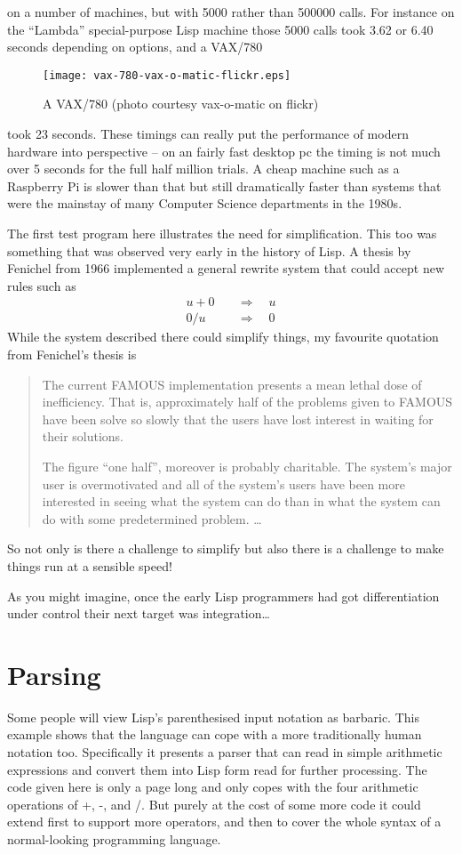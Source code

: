 on a number of machines, but with 5000 rather than 500000 calls. For
instance on the ``Lambda'' special-purpose Lisp machine those 5000
calls took 3.62 or 6.40 seconds depending on options, and a VAX/780
\begin{wrapfigure}{r}{2.5in}
{\centering
\texttt{[image: vax-780-vax-o-matic-flickr.eps]}}
\caption{A VAX/780 (photo courtesy vax-o-matic on flickr)}
\end{wrapfigure} took 23 seconds. These timings can really put the
performance of modern hardware into perspective -- on an fairly fast
desktop pc the \vsl{} timing is not much over 5 seconds for the
full half million trials. A cheap machine such as a Raspberry Pi
is slower than that but still dramatically faster than systems that
were the mainstay of many Computer Science departments in the 1980s.

The first test program here illustrates the need for simplification. This
too was something that was observed very early in the history of Lisp.
A thesis by Fenichel\cite{Fenichel} from 1966 implemented a general
rewrite system that could accept new rules such as
\begin{align*}
u + 0 \quad & \Rightarrow \quad u \\
0 / u \quad & \Rightarrow \quad 0 
\end{align*}
While the system described there could simplify things, my favourite
quotation from Fenichel's thesis is
{\em \begin{quotation}
The current FAMOUS implementation presents a mean lethal dose of inefficiency.
That is, approximately half of the problems given to FAMOUS have been
solve so slowly that the users have lost interest in waiting for their
solutions.

The figure ``one half'', moreover is probably charitable. The system's major
user is overmotivated and all of the system's users have been more
interested in seeing what the system can do than in what the system can do
with some predetermined problem. \ldots
\end{quotation}}

So not only is there a challenge to simplify but also there is a
challenge to make things run at a sensible speed!

As you might imagine, once the early Lisp programmers had got differentiation
under control their next target was integration\ldots

\section{Parsing}
Some people will view Lisp's parenthesised input notation as barbaric.
This example shows that the language can cope with a more traditionally
human notation too. Specifically it presents a parser that can read
in simple arithmetic expressions and convert them into Lisp form read
for further processing. The code given here is only a page long and only
copes with the four arithmetic operations of {\tx +}, {\tx -}, {\tx *} and
{\tx /}. But purely at the cost of some more code it could extend first
to support more operators, and then to cover the whole syntax of a
normal-looking programming language.

